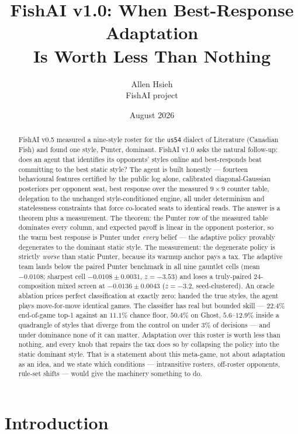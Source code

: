 \documentclass[11pt]{article}
\title{FishAI v1.0: When Best-Response Adaptation\\ Is Worth Less Than Nothing}
\author{Allen Hsieh\\[2pt] {\small FishAI project}}
\date{August 2026}
\newcommand{\code}[1]{\texttt{#1}}
\newcommand{\usff}{\code{us54}}
\begin{document}
\maketitle

\begin{abstract}
\noindent
FishAI v0.5 measured a nine-style roster for the \usff{} dialect of Literature (Canadian
Fish) and found one style, Punter, dominant. FishAI v1.0 asks the natural follow-up: does
an agent that identifies its opponents' styles online and best-responds beat committing to
the best static style? The agent is built honestly --- fourteen behavioural features
certified by the public log alone, calibrated diagonal-Gaussian posteriors per opponent
seat, best response over the measured $9 \times 9$ counter table, delegation to the
unchanged style-conditioned engine, all under determinism and statelessness constraints
that force co-located seats to identical reads. The answer is a theorem plus a
measurement. The theorem: the Punter row of the measured table dominates every column, and
expected payoff is linear in the opponent posterior, so the warm best response is Punter
under \emph{every} belief --- the adaptive policy provably degenerates to the dominant
static style. The measurement: the degenerate policy is strictly \emph{worse} than static
Punter, because its warmup anchor pays a tax. The adaptive team lands below the paired
Punter benchmark in all nine gauntlet cells (mean $-0.0108$; sharpest cell
$-0.0108 \pm 0.0031$, $z = -3.53$) and loses a truly-paired 24-composition mixed screen at
$-0.0136 \pm 0.0043$ ($z = -3.2$, seed-clustered). An oracle ablation prices perfect
classification at
exactly zero: handed the true styles, the agent plays move-for-move identical games. The
classifier has real but bounded skill --- $22.4\%$ end-of-game top-1 against an $11.1\%$
chance floor, $50.4\%$ on Ghost, $5.6$--$12.9\%$ inside a quadrangle of styles that
diverge from the control on under $3\%$ of decisions --- and under dominance none of it
can matter. Adaptation over this roster is worth less than nothing, and every knob that
repairs the tax does so by collapsing the policy into the static dominant style. That is a
statement about this meta-game, not about adaptation as an idea, and we state which
conditions --- intransitive rosters, off-roster opponents, rule-set shifts --- would give
the machinery something to do.
\end{abstract}

\section{Introduction}
\label{sec:intro}
\end{document}
